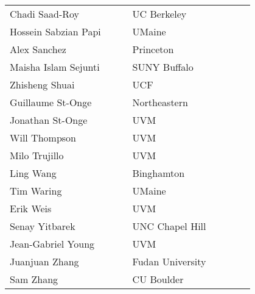 \begin{center}
\begin{longtable}{p{0.4\linewidth} p{0.4\linewidth} }
    Chadi Saad-Roy & UC Berkeley \\ 
    Hossein Sabzian Papi & UMaine \\ 
    Alex Sanchez & Princeton \\
    Maisha Islam Sejunti & SUNY Buffalo \\ 
    Zhisheng Shuai & UCF \\ 
    Guillaume St-Onge & Northeastern \\ 
    Jonathan St-Onge & UVM \\ 
    Will Thompson & UVM \\ 
    Milo Trujillo & UVM \\ 
    Ling Wang & Binghamton \\ 
    Tim Waring & UMaine \\ 
    Erik Weis & UVM \\ 
    Senay Yitbarek & UNC Chapel Hill \\ 
    Jean-Gabriel Young & UVM \\ 
    Juanjuan Zhang & Fudan University \\ 
    Sam Zhang & CU Boulder \\ 
    \end{longtable}
    \end{center}